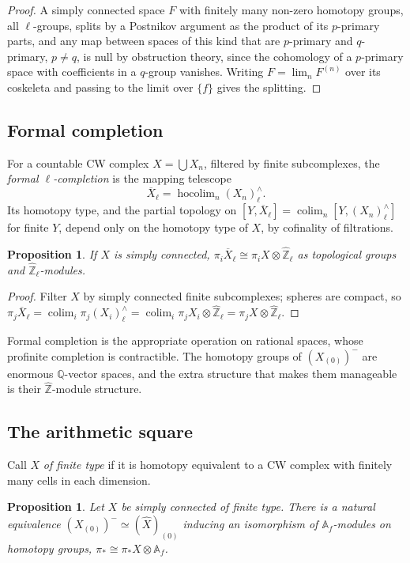 \documentclass[11pt]{amsart}
\theoremstyle{plain}
\newtheorem{proposition}[theorem]{Proposition}
\theoremstyle{definition}
\numberwithin{equation}{section}
\newcommand{\Q}{\mathbb{Q}}
\newcommand{\Zhat}{\widehat{\mathbb{Z}}}
\newcommand{\Af}{\mathbb{A}_f}
\newcommand{\hX}{\widehat{X}}
\DeclareMathOperator{\hocolim}{hocolim}
\DeclareMathOperator{\colim}{colim}
\begin{document}
\begin{proof}
A simply connected space $F$ with finitely many non-zero homotopy groups, all $\ell$-groups, splits by a Postnikov argument as the product of its $p$-primary parts, and any map between spaces of this kind that are $p$-primary and $q$-primary, $p\ne q$, is null by obstruction theory, since the cohomology of a $p$-primary space with coefficients in a $q$-group vanishes.
Writing $F=\lim_nF^{(n)}$ over its coskeleta and passing to the limit over $\{f\}$ gives the splitting.
\end{proof}

\subsection{Formal completion}
For a countable CW complex $X=\bigcup X_n$, filtered by finite subcomplexes, the \emph{formal $\ell$-completion} is the mapping telescope
\[
\overline X_\ell=\hocolim_n(X_n)^\wedge_\ell .
\]
Its homotopy type, and the partial topology on $[Y,\overline X_\ell]=\colim_n[Y,(X_n)^\wedge_\ell]$ for finite $Y$, depend only on the homotopy type of $X$, by cofinality of filtrations.

\begin{proposition}\label{prop:formalcompletion}
If $X$ is simply connected, $\pi_i\overline X_\ell\cong\pi_iX\otimes\Zhat_\ell$ as topological groups and $\Zhat_\ell$-modules.
\end{proposition}

\begin{proof}
Filter $X$ by simply connected finite subcomplexes; spheres are compact, so $\pi_j\overline X_\ell=\colim_i\pi_j(X_i)^\wedge_\ell=\colim_i\pi_jX_i\otimes\Zhat_\ell=\pi_jX\otimes\Zhat_\ell$.
\end{proof}

Formal completion is the appropriate operation on rational spaces, whose profinite completion is contractible.
The homotopy groups of $(X_{(0)})^-$ are enormous $\Q$-vector spaces, and the extra structure that makes them manageable is their $\Zhat$-module structure.

\subsection{The arithmetic square}
Call $X$ \emph{of finite type} if it is homotopy equivalent to a CW complex with finitely many cells in each dimension.

\begin{proposition}\label{prop:adeletype}
Let $X$ be simply connected of finite type.
There is a natural equivalence $(X_{(0)})^-\simeq(\hX)_{(0)}$ inducing an isomorphism of $\Af$-modules on homotopy groups, $\pi_*\cong\pi_*X\otimes\Af$.
\end{proposition}
\end{document}
